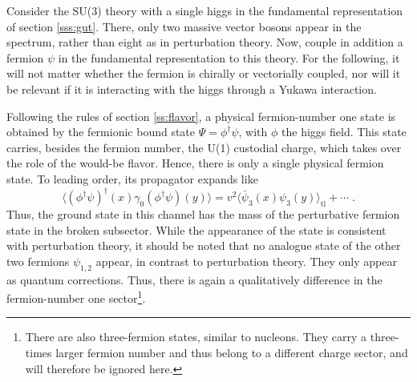 \documentclass[final,twoside,12pt]{article}
\newcommand*{\no}{\noindent}
\newcommand*{\be}{\begin{equation}}
\newcommand*{\ee}{\end{equation}}
\newcommand*{\nn}{\nonumber}
\newcommand*{\1}{1\!\!\!\bot}
\begin{document}
Consider the SU(3) theory with a single higgs in the fundamental representation of section \ref{sss:gut}. There, only two massive vector bosons appear in the spectrum, rather than eight as in perturbation theory. Now, couple in addition a fermion $\psi$ in the fundamental representation to this theory. For the following, it will not matter whether the fermion is chirally or vectorially coupled, nor will it be relevant if it is interacting with the higgs through a Yukawa interaction.

Following the rules of section \ref{ss:flavor}, a physical fermion-number one state is obtained by the fermionic bound state $\Psi=\phi^\dagger\psi$, with $\phi$ the higgs field. This state carries, besides the fermion number, the U(1) custodial charge, which takes over the role of the would-be flavor. Hence, there is only a single physical fermion state. To leading order, its propagator expands like
\be
\big\langle(\phi^\dagger\psi)^\dagger(x)\gamma_0(\phi^\dagger\psi)(y)\big\rangle =v^2\big\langle\bar{\psi}_3(x)\psi_3(y)\big\rangle_\mathrm{tl}+\cdots\;\nn.
\ee
\no Thus, the ground state in this channel has the mass of the perturbative fermion state in the broken subsector. While the appearance of the state is consistent with perturbation theory, it should be noted that no analogue state of the other two fermions $\psi_{1,2}$ appear, in contrast to perturbation theory. They only appear as quantum corrections. Thus, there is again a qualitatively difference in the fermion-number one sector\footnote{There are also three-fermion states, similar to nucleons. They carry a three-times larger fermion number and thus belong to a different charge sector, and will therefore be ignored here.}.
\end{document}

